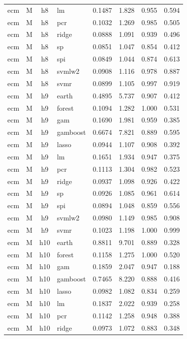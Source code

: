 \begin{ThreePartTable}
\begin{longtable}[t]{llclcccc}
ecm & M & h8 & lm & 0.1487 & 1.828 & 0.955 & 0.594\\
ecm & M & h8 & pcr & 0.1032 & 1.269 & 0.985 & 0.505\\
ecm & M & h8 & ridge & 0.0888 & 1.091 & 0.939 & 0.496\\
ecm & M & h8 & sp & 0.0851 & 1.047 & 0.854 & 0.412\\
ecm & M & h8 & spi & 0.0849 & 1.044 & 0.874 & 0.613\\
ecm & M & h8 & svmlw2 & 0.0908 & 1.116 & 0.978 & 0.887\\
ecm & M & h8 & svmr & 0.0899 & 1.105 & 0.997 & 0.919\\
\addlinespace
ecm & M & h9 & earth & 0.4895 & 5.737 & 0.907 & 0.412\\
ecm & M & h9 & forest & 0.1094 & 1.282 & 1.000 & 0.531\\
ecm & M & h9 & gam & 0.1690 & 1.981 & 0.959 & 0.385\\
ecm & M & h9 & gamboost & 0.6674 & 7.821 & 0.889 & 0.595\\
ecm & M & h9 & lasso & 0.0944 & 1.107 & 0.908 & 0.392\\
ecm & M & h9 & lm & 0.1651 & 1.934 & 0.947 & 0.375\\
ecm & M & h9 & pcr & 0.1113 & 1.304 & 0.982 & 0.523\\
ecm & M & h9 & ridge & 0.0937 & 1.098 & 0.926 & 0.422\\
ecm & M & h9 & sp & 0.0926 & 1.085 & 0.961 & 0.614\\
ecm & M & h9 & spi & 0.0894 & 1.048 & 0.859 & 0.556\\
ecm & M & h9 & svmlw2 & 0.0980 & 1.149 & 0.985 & 0.908\\
ecm & M & h9 & svmr & 0.1023 & 1.198 & 1.000 & 0.999\\
\addlinespace
ecm & M & h10 & earth & 0.8811 & 9.701 & 0.889 & 0.328\\
ecm & M & h10 & forest & 0.1158 & 1.275 & 1.000 & 0.520\\
ecm & M & h10 & gam & 0.1859 & 2.047 & 0.947 & 0.188\\
ecm & M & h10 & gamboost & 0.7465 & 8.220 & 0.888 & 0.416\\
ecm & M & h10 & lasso & 0.0982 & 1.082 & 0.834 & 0.259\\
ecm & M & h10 & lm & 0.1837 & 2.022 & 0.939 & 0.258\\
ecm & M & h10 & pcr & 0.1142 & 1.258 & 0.948 & 0.388\\
ecm & M & h10 & ridge & 0.0973 & 1.072 & 0.883 & 0.348\\

\end{longtable}
\end{ThreePartTable}
